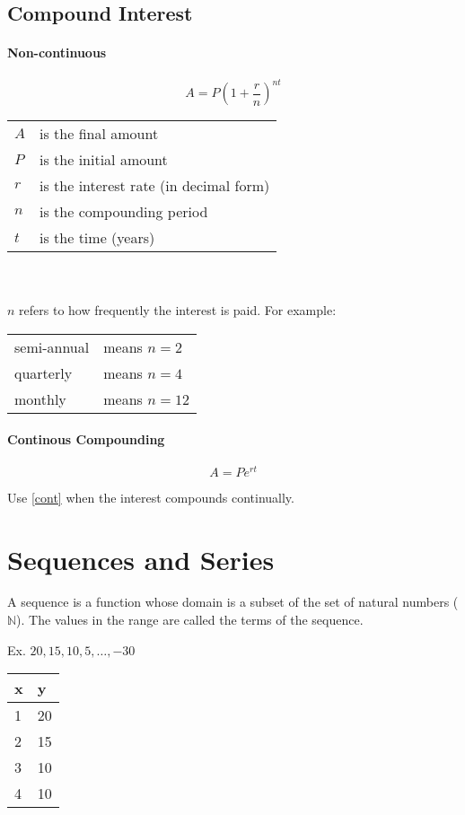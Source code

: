 \documentclass{article}
\numberwithin{equation}{section}
\begin{document}
\subsection{Compound Interest} \label{cmpint}
\paragraph{Non-continuous}
\begin{samepage}
\begin{equation}
	A = P {\left( 1 + \frac{r}{n} \right)} ^ {nt}
\end{equation}

\begin{tabular}{l l}
	$A$ & is the final amount \\
	$P$ & is the initial amount \\
	$r$ & is the interest rate (in decimal form) \\
	$n$ & is the compounding period \\
	$t$ & is the time (years)
\end{tabular}
\end{samepage}
\\ \\
$n$ refers to how frequently the interest is paid. For example:
\begin{center}
\begin{tabular}{l l}
	semi-annual & means $n=2$ \\
	quarterly& means $n=4$ \\
	monthly & means $n=12$
\end{tabular}
\end{center}

\paragraph{Continous Compounding}
\begin{equation} \label{cont}
	A = P e^{rt}
\end{equation}

Use \eqref{cont} when the interest compounds continually.

\section{Sequences and Series}
A sequence is a function whose domain is a subset of the set of natural numbers ($\mathbb{N}$). The values in the range are called the terms of the sequence.

\begin{center}
Ex. $20, 15, 10, 5, \dotso , -30$

\bigskip

\begin{tabular}{l | l}
	x & y \\ \hline 
	1 & 20 \\
	2 & 15 \\
	3 & 10 \\
	4 & 10 \\
\end{tabular}
\end{center}
\end{document}
